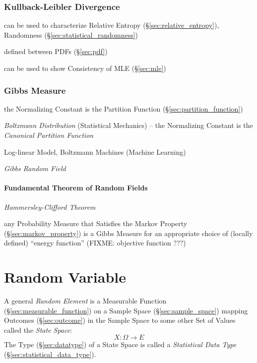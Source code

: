 \subsubsection{Kullback-Leibler Divergence}\label{sec:kullback_leibler}

can be used to characterize Relative Entropy (\S\ref{sec:relative_entropy}),
Randomness (\S\ref{sec:statistical_randomness})

defined between PDFs (\S\ref{sec:pdf})

can be used to show Consistency of MLE (\S\ref{sec:mle})



\subsubsection{Gibbs Measure}\label{sec:gibbs_measure}

the Normalizing Constant is the Partition Function
(\S\ref{sec:partition_function})

\emph{Boltzmann Distribution} (Statistical Mechanics) -- the Normalizing
Constant is the \emph{Canonical Partition Function}

Log-linear Model, Boltzmann Machines (Machine Learning)

\emph{Gibbs Random Field}



\paragraph{Fundamental Theorem of Random Fields}
\label{sec:random_fields_theorem}\hfill

\emph{Hammersley-Clifford Theorem}

any Probability Measure that Satisfies the Markov Property
(\S\ref{sec:markov_property}) is a Gibbs Measure for an appropriate choice of
(locally defined) ``energy function'' (FIXME: objective function ???)



\section{Random Variable}\label{sec:random_variable}

A general \emph{Random Element} is a Measurable Function
(\S\ref{sec:measurable_function}) on a Sample Space (\S\ref{sec:sample_space})
mapping Outcomes (\S\ref{sec:outcome}) in the Sample Space to some other Set of
Values called the \emph{State Space}:
\[
  X : \Omega \to E
\]
The Type (\S\ref{sec:datatype}) of a State Space is called a \emph{Statistical
  Data Type} (\S\ref{sec:statistical_data_type}).

